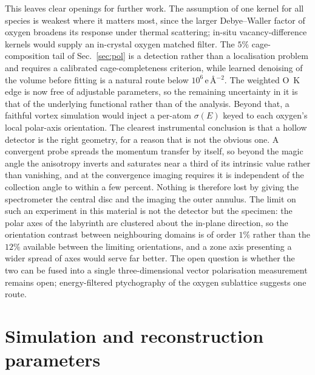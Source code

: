 \documentclass[aps,prb,twocolumn,superscriptaddress,floatfix,nofootinbib]{revtex4-2}
\begin{document}
This leaves clear openings for further work. The assumption of one kernel for all species is
weakest where it matters most, since the larger Debye--Waller factor of oxygen broadens its
response under thermal scattering; in-situ vacancy-difference kernels would supply an in-crystal
oxygen matched filter. The $5\%$ cage-composition tail of Sec.~\ref{sec:pol} is a detection rather than a
localisation problem and requires a calibrated cage-completeness criterion, while learned
denoising of the volume before fitting \citep{Wu2026} is a natural route below
$10^{6}$\,e\,\AA$^{-2}$. The
weighted O~K edge is now free of adjustable parameters, so the remaining uncertainty in it is
that of the underlying functional rather than of the analysis. Beyond that, a faithful vortex simulation would inject a per-atom $\sigma(E)$
keyed to each oxygen's local polar-axis orientation. The clearest instrumental conclusion is that a
hollow detector is the right geometry, for a reason that is not the obvious one. A convergent
probe spreads the momentum transfer by itself, so beyond the magic angle the anisotropy inverts
and saturates near a third of its intrinsic value rather than vanishing, and at the convergence
imaging requires it is independent of the collection angle to within a few percent. Nothing is
therefore lost by giving the spectrometer the central disc and the imaging the outer annulus. The
limit on such an experiment in this material is not the detector but the specimen: the polar axes
of the labyrinth are clustered about the in-plane direction, so the orientation contrast between
neighbouring domains is of order $1\%$ rather than the $12\%$ available between the limiting
orientations, and a zone axis presenting a wider spread of axes would serve far better. The open question is whether the two can be fused into a
single three-dimensional vector polarisation measurement remains open; energy-filtered
ptychography of the oxygen sublattice \citep{Dong2024} suggests one route.


\clearpage
\appendix
\renewcommand{\thetable}{\thesection\arabic{table}}
\renewcommand{\thefigure}{\thesection\arabic{figure}}
\setcounter{table}{0}
\setcounter{figure}{0}

\section{Simulation and reconstruction parameters}
\label{app:params}
\setcounter{table}{0}
\setcounter{figure}{0}
\end{document}
